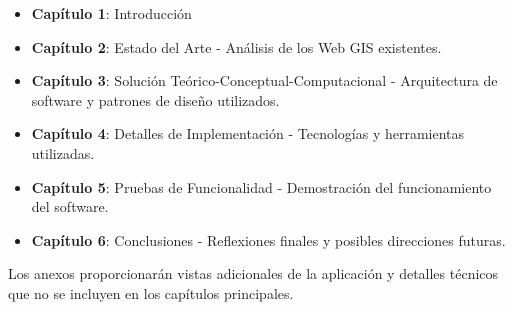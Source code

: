 \begin{itemize}
\item
  \textbf{Capítulo 1}: Introducción
\item
  \textbf{Capítulo 2}: Estado del Arte - Análisis de los Web GIS
  existentes.
\item
  \textbf{Capítulo 3}: Solución Teórico-Conceptual-Computacional -
  Arquitectura de software y patrones de diseño utilizados.
\item
  \textbf{Capítulo 4}: Detalles de Implementación - Tecnologías y
  herramientas utilizadas.
\item
  \textbf{Capítulo 5}: Pruebas de Funcionalidad - Demostración del
  funcionamiento del software.
\item
  \textbf{Capítulo 6}: Conclusiones - Reflexiones finales y posibles
  direcciones futuras.
\end{itemize}

Los anexos proporcionarán vistas adicionales de la aplicación y detalles
técnicos que no se incluyen en los capítulos principales.



